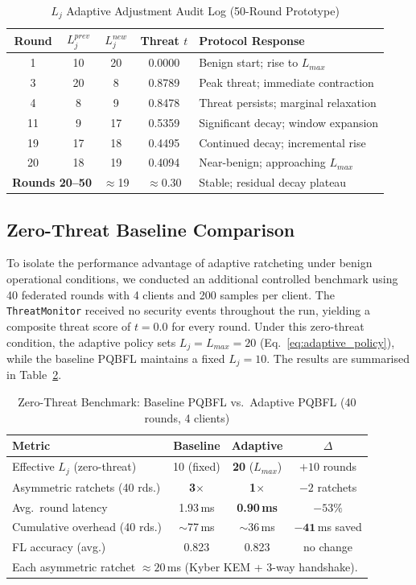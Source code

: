 \documentclass[journal, 10pt, twocolumn]{IEEEtran}
\begin{document}
\begin{table}
\centering
\caption{$L_j$ Adaptive Adjustment Audit Log (50-Round Prototype)}
\label{tab:L_j_audit}
\begin{tabular}{c c c c l}
\toprule
\textbf{Round} & $L_j^{prev}$ & $L_j^{new}$ & \textbf{Threat} $t$ & \textbf{Protocol Response} \\
\midrule
1  & 10 & 20 & 0.0000 & Benign start; rise to $L_{max}$ \\
3  & 20 & 8  & 0.8789 & Peak threat; immediate contraction \\
4  & 8  & 9  & 0.8478 & Threat persists; marginal relaxation \\
11 & 9  & 17 & 0.5359 & Significant decay; window expansion \\
19 & 17 & 18 & 0.4495 & Continued decay; incremental rise \\
20 & 18 & 19 & 0.4094 & Near-benign; approaching $L_{max}$ \\
\midrule
\multicolumn{2}{l}{\textbf{Rounds 20--50}} & $\approx$19 & $\approx$0.30 & Stable; residual decay plateau \\
\bottomrule
\end{tabular}
\end{table}

\subsection{Zero-Threat Baseline Comparison}
\label{subsec:zero_threat}
To isolate the performance advantage of adaptive ratcheting under benign operational conditions, we conducted an additional controlled benchmark using 40 federated rounds with 4 clients and 200 samples per client. The \texttt{ThreatMonitor} received no security events throughout the run, yielding a composite threat score of $t = 0.0$ for every round. Under this zero-threat condition, the adaptive policy sets $L_j = L_{max} = 20$ (Eq.~\eqref{eq:adaptive_policy}), while the baseline PQBFL maintains a fixed $L_j = 10$. The results are summarised in Table~\ref{tab:zero_threat_comparison}.

\begin{table}[H]
\centering
\caption{Zero-Threat Benchmark: Baseline PQBFL vs.\ Adaptive PQBFL (40 rounds, 4 clients)}
\label{tab:zero_threat_comparison}
\begin{tabular}{l c c c}
\toprule
\textbf{Metric} & \textbf{Baseline} & \textbf{Adaptive} & $\Delta$ \\
\midrule
Effective $L_j$ (zero-threat) & 10 (fixed) & \textbf{20} ($L_{max}$) & $+10$ rounds \\
Asymmetric ratchets (40 rds.) & \textbf{3}$\times$ & \textbf{1}$\times$ & $-2$ ratchets \\
Avg.\ round latency & 1.93\,ms & \textbf{0.90\,ms} & $-53\%$ \\
Cumulative overhead (40 rds.) & $\sim$77\,ms & $\sim$36\,ms & $\mathbf{-41}$\,ms saved \\
FL accuracy (avg.) & 0.823 & 0.823 & no change \\
\bottomrule
\multicolumn{4}{l}{\small Each asymmetric ratchet $\approx 20$\,ms (Kyber KEM + 3-way handshake).}
\end{tabular}
\end{table}
\end{document}
